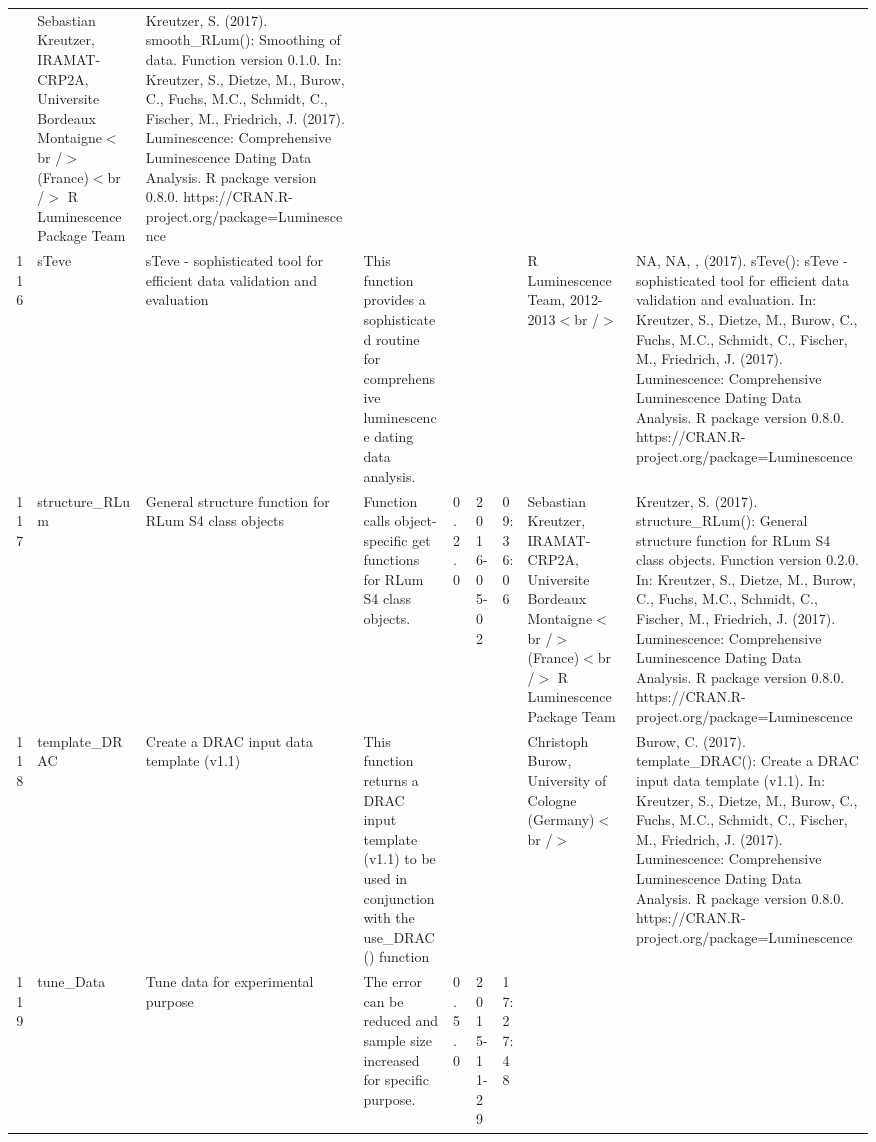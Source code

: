\begin{table}[ht]
\begin{tabular}{rllllllll}
 & Sebastian Kreutzer, IRAMAT-CRP2A, Universite Bordeaux Montaigne$<$br /$>$ (France)$<$br /$>$  R Luminescence Package Team & Kreutzer, S. (2017). smooth\_RLum(): Smoothing of data. Function version 0.1.0. In: Kreutzer, S., Dietze, M., Burow, C., Fuchs, M.C., Schmidt, C., Fischer, M., Friedrich, J. (2017). Luminescence: Comprehensive Luminescence Dating Data Analysis. R package version 0.8.0. https://CRAN.R-project.org/package=Luminescence
 \\ 
  116 & sTeve & sTeve - sophisticated tool for efficient data validation and evaluation & This function provides a sophisticated routine for comprehensive luminescence dating data analysis. &  &  &  & R Luminescence Team, 2012-2013$<$br /$>$ & NA, NA, ,  (2017). sTeve(): sTeve - sophisticated tool for efficient data validation and evaluation. In: Kreutzer, S., Dietze, M., Burow, C., Fuchs, M.C., Schmidt, C., Fischer, M., Friedrich, J. (2017). Luminescence: Comprehensive Luminescence Dating Data Analysis. R package version 0.8.0. https://CRAN.R-project.org/package=Luminescence
 \\ 
  117 & structure\_RLum & General structure function for RLum S4 class objects & Function calls object-specific get functions for RLum S4 class objects. & 0.2.0 & 2016-05-02 & 09:36:06
 & Sebastian Kreutzer, IRAMAT-CRP2A, Universite Bordeaux Montaigne$<$br /$>$ (France)$<$br /$>$  R Luminescence Package Team & Kreutzer, S. (2017). structure\_RLum(): General structure function for RLum S4 class objects. Function version 0.2.0. In: Kreutzer, S., Dietze, M., Burow, C., Fuchs, M.C., Schmidt, C., Fischer, M., Friedrich, J. (2017). Luminescence: Comprehensive Luminescence Dating Data Analysis. R package version 0.8.0. https://CRAN.R-project.org/package=Luminescence
 \\ 
  118 & template\_DRAC & Create a DRAC input data template (v1.1) & This function returns a DRAC input template (v1.1) to be used in conjunction with the use\_DRAC() function &  &  &  & Christoph Burow, University of Cologne (Germany)$<$br /$>$ & Burow, C. (2017). template\_DRAC(): Create a DRAC input data template (v1.1). In: Kreutzer, S., Dietze, M., Burow, C., Fuchs, M.C., Schmidt, C., Fischer, M., Friedrich, J. (2017). Luminescence: Comprehensive Luminescence Dating Data Analysis. R package version 0.8.0. https://CRAN.R-project.org/package=Luminescence
 \\ 
  119 & tune\_Data & Tune data for experimental purpose & The error can be reduced and sample size increased for specific purpose. & 0.5.0 & 2015-11-29 & 17:27:48

\end{tabular}
\end{table}
